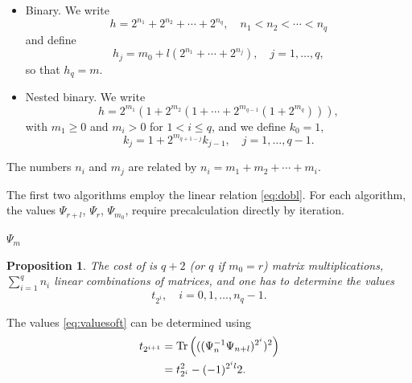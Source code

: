 \documentclass[a4paper,fleqn]{cas-sc}
\def\Tr{{\rm Tr}}
\newtheorem{proposition}[theorem]{Proposition}
\begin{document}
\begin{itemize}
\item Binary. We write
\begin{equation} \label{eq:bin}
h=2^{n_1}+2^{n_2}+\cdots+2^{n_q},\quad n_1<n_2<\cdots<n_q
\end{equation}
and define
\begin{equation} \label{eq:hj}
h_j=m_0+l(2^{n_1}+\cdots+2^{n_j}),\quad j=1,\ldots,q,
\end{equation}
so that $h_q=m$.
\item Nested binary. We write
\begin{equation} \label{eq:ms}
h=2^{m_1}(1+2^{m_2}(1+\cdots+2^{m_{q-1}}(1+2^{m_q}))),
\end{equation}
with $m_1\geq 0$ and $m_i>0$ for $1<i\leq q$, and we define $k_0=1$,
\begin{equation} \label{eq:kj}
k_j=1+2^{m_{q+1-j}}k_{j-1},\quad j=1,\ldots,q-1.
\end{equation}
\end{itemize}
The numbers $n_i$ and $m_j$ are related by $n_i=m_1+m_2+\cdots+m_i$. 

The first two algorithms employ the linear relation \eqref{eq:dobl}. For each algorithm, the values $\Psi_{r+l}$, $\Psi_r$, $\Psi_{m_0}$, require precalculation directly by iteration.

\begin{algorithm}
\caption{Binary, additive.\\
Input: $r,l,m\geq r+l$, binary representation \eqref{eq:bin}, \eqref{eq:hj}.\\
Output: An expression for $\Psi_m$ in terms of $\Psi_{r+l}$, $\Psi_r$, $\Psi_{m_0}$ and the values \eqref{eq:valuesoft}.}
\label{alg:ALG1}
\begin{algorithmic}
\ENDIF
{}
\ENDFOR
{}
\ENDIF
\ENDFOR
\RETURN $\Psi_m$
\end{algorithmic}
\end{algorithm}

\begin{proposition}
The cost of  is $q+2$ (or $q$ if $m_0=r$) matrix multiplications, $\sum_{i=1}^q n_i$ linear combinations of matrices, and one has to determine the values
\begin{equation} \label{eq:valuesoft}
t_{2^i},\quad i=0,1,\ldots,n_q-1.
\end{equation}
\end{proposition}
The values \eqref{eq:valuesoft} can be determined using
\begin{align}
t_{2^{i+1}}&=\Tr\left(((\Psi_n^{-1}\Psi_{n+l})^{2^i})^2\right)\notag\\
&=t_{2^i}^2-(-1)^{2^il}2.\label{t2}
\end{align}
\end{document}
